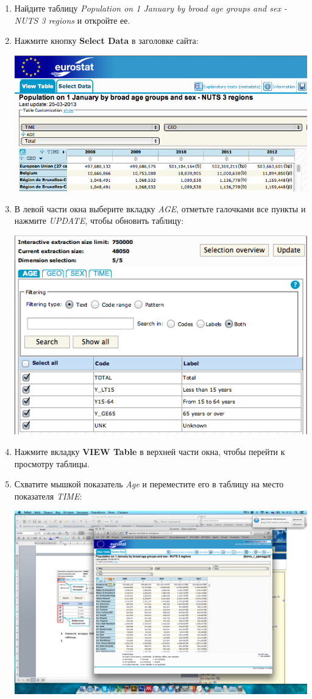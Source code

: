 \documentclass[]{book}
\theoremstyle{definition}
\theoremstyle{definition}
\theoremstyle{definition}
\theoremstyle{remark}
\begin{document}
\begin{enumerate}
\def\labelenumi{\arabic{enumi}.}
\item
  Найдите таблицу \emph{Population on 1 January by broad age groups and
  sex - NUTS 3 regions} и откройте ее.
\item
  Нажмите кнопку \textbf{Select Data} в заголовке сайта:

  \includegraphics{images/Ex08/image11.png}
\item
  В левой части окна выберите вкладку \emph{AGE}, отметьте галочками все
  пункты и нажмите \emph{UPDATE}, чтобы обновить таблицу:

  \includegraphics{images/Ex08/image12.png}
\item
  Нажмите вкладку \textbf{VIEW Table} в верхней части окна, чтобы
  перейти к просмотру таблицы.
\item
  Схватите мышкой показатель \emph{Age} и переместите его в таблицу на
  место показателя \emph{TIME}:

  \includegraphics{images/Ex08/image13.png}


\end{enumerate}
\end{document}
